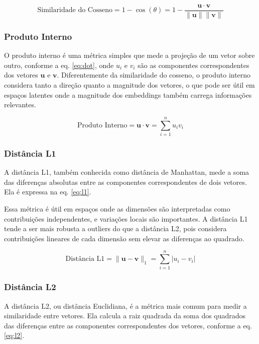 \begin{equation}\label{eq:cos}
  \text{Similaridade do Cosseno} = 1-\cos(\theta) = 1-\frac{\mathbf{u} \cdot \mathbf{v}}{\|\mathbf{u}\| \|\mathbf{v}\|}
\end{equation}



\subsubsection{Produto Interno}
\label{sec:metricas-dot}

O produto interno é uma métrica simples que mede a projeção de um vetor sobre outro, conforme a eq. \eqref{eq:dot}, onde \( u_i \) e \( v_i \) são as componentes correspondentes dos vetores \( \mathbf{u} \) e \( \mathbf{v} \). Diferentemente da similaridade do cosseno, o produto interno considera tanto a direção quanto a magnitude dos vetores, o que pode ser útil em espaços latentes onde a magnitude dos embeddings também carrega informações relevantes.

\begin{equation}\label{eq:dot}
  \text{Produto Interno} = \mathbf{u} \cdot \mathbf{v} = \sum_{i=1}^n u_i v_i
\end{equation}



\subsubsection{Distância L1}
\label{sec:metricas-l1}
A distância L1, também conhecida como distância de Manhattan, mede a soma das diferenças absolutas entre as componentes correspondentes de dois vetores. Ela é expressa na eq. \eqref{eq:l1}.

Essa métrica é útil em espaços onde as dimensões são interpretadas como contribuições independentes, e variações locais são importantes. A distância L1 tende a ser mais robusta a outliers do que a distância L2, pois considera contribuições lineares de cada dimensão sem elevar as diferenças ao quadrado.

\begin{equation}\label{eq:l1}
  \text{Distância L1} = \|\mathbf{u} - \mathbf{v}\|_1 = \sum_{i=1}^n |u_i - v_i|
\end{equation}


\subsubsection{Distância L2}
\label{sec:metricas-l2}
A distância L2, ou distância Euclidiana, é a métrica mais comum para medir a similaridade entre vetores. Ela calcula a raiz quadrada da soma dos quadrados das diferenças entre as componentes correspondentes dos vetores, conforme a eq. \eqref{eq:l2}.

